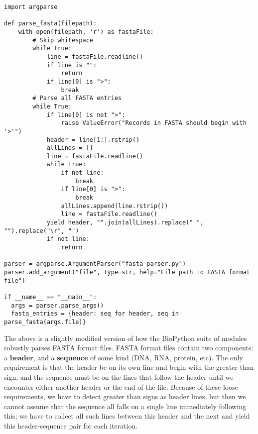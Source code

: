 \documentclass[a4paper,11pt]{article}
\begin{document}
\vspace{3mm}
\begin{lstlisting}
import argparse

def parse_fasta(filepath):
    with open(filepath, 'r') as fastaFile:
        # Skip whitespace
        while True:
            line = fastaFile.readline()
            if line is "":
                return
            if line[0] is ">":
                break
        # Parse all FASTA entries
        while True:
            if line[0] is not ">":
                raise ValueError("Records in FASTA should begin with '>'")
            header = line[1:].rstrip()
            allLines = []
            line = fastaFile.readline()
            while True:
                if not line:
                    break
                if line[0] is ">":
                    break
                allLines.append(line.rstrip())
                line = fastaFile.readline()
            yield header, "".join(allLines).replace(" ", "").replace("\r", "")
            if not line:
                return

parser = argparse.ArgumentParser("fasta_parser.py")
parser.add_argument("file", type=str, help="File path to FASTA format file")

if __name__ == "__main__":
  args = parser.parse_args()
  fasta_entries = {header: seq for header, seq in parse_fasta(args.file)}
\end{lstlisting}
\vspace{3mm}

The above is a slightly modified version of how the BioPython suite of modules robustly 
parses FASTA format files.  FASTA format files contain two components: a \textbf{header}, 
and a \textbf{sequence} of some kind (DNA, RNA, protein, etc).  The only requirement is that 
the header be on its own line and begin with the greater than sign, and the sequence must 
be on the lines that follow the header until we encounter either another header or the end 
of the file.  Because of these loose requirements, we have to detect greater than signs as 
header lines, but then we cannot assume that the sequence all falls on a single line immediately 
following this; we have to collect all such lines between this header and the next and yield 
this header-sequence pair for each iteration.  \par
\end{document}
